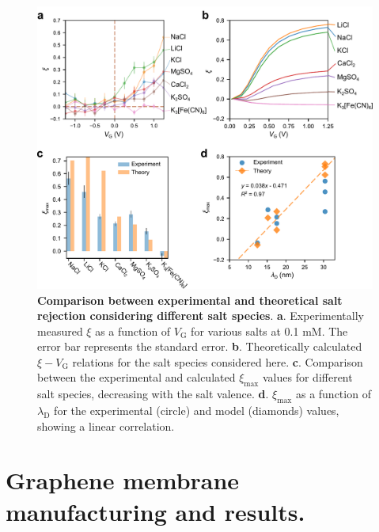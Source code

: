 \documentclass[journal=langd5,email=true, hyperref=true, keywords=false]{achemso}
\begin{document}
\begin{figure}[htbp]
  \centering
  \includegraphics[width=0.95\linewidth]{img/fig6.pdf}
  \caption{\textbf{Comparison between experimental and theoretical
      salt rejection considering different salt
      species}. \textbf{a}. Experimentally measured $\xi$ as a
    function of $V_{\mathrm{G}}$ for various salts at 0.1 mM. The
    error bar represents the standard error. \textbf{b}. Theoretically
    calculated $\xi-V_{\mathrm{G}}$ relations for the salt species
    considered here. \textbf{c}. Comparison between the experimental
    and calculated $\xi_{\mathrm{max}}$ values for different salt
    species, decreasing with the salt
    valence. \textbf{d}. $\xi_{\mathrm{max}}$ as a function of
    $\lambda_{\mathrm{D}}$ for the experimental (circle) and model
    (diamonds) values, showing a linear correlation.}
  \label{fig:6}
\end{figure}




\clearpage{}

\clearpage{}

\setcounter{page}{1}
\setcounter{section}{0}
\setcounter{equation}{0}
\setcounter{figure}{0}
\setcounter{table}{0}
\renewcommand{\thepage}{S\arabic{page}}
\renewcommand{\thesection}{S\arabic{section}}
\renewcommand{\theequation}{S\arabic{equation}}
\renewcommand{\thefigure}{S\arabic{figure}}
\renewcommand{\thetable}{S\arabic{table}}


\section{Graphene membrane manufacturing and results.}
\label{sec:exp}
\end{document}
